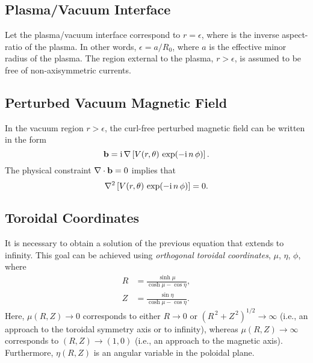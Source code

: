 \documentclass[12pt,prb,aps]{revtex4-1}
\begin{document}
\subsection{Plasma/Vacuum Interface}
Let the plasma/vacuum interface  correspond to $r=\epsilon$, where  is the inverse aspect-ratio of the
plasma. In other words, $\epsilon=a/R_0$, where $a$ is the effective minor radius of the plasma. 
The region external to the plasma, $r>\epsilon$, is assumed to be  free of non-axisymmetric currents.

\subsection{Perturbed Vacuum Magnetic Field}\label{pertb}
In the vacuum region $r>\epsilon$, the curl-free perturbed magnetic field can be written in the form\,\cite{am1}
\begin{equation}\label{vdef}
{\bf b} = {\rm i}\,\nabla\left[ V(r,\theta)\,\exp(-{\rm i}\,n\,\phi)\right].
\end{equation}
The physical constraint $\nabla\cdot {\bf b} =0$ implies that
\begin{equation}\label{elaplace}
\nabla^2 \left[V(r,\theta)\,\exp(-{\rm i}\,n\,\phi)\right]= 0.
\end{equation}

\subsection{Toroidal Coordinates}
It is necessary to obtain a solution of the previous equation that extends to infinity. This goal can be achieved using {\em orthogonal toroidal coordinates}, $\mu$, $\eta$, $\phi$, 
where\,\cite{morse}
\begin{align}\label{e54cx}
R &= \frac{\sinh\mu}{\cosh\mu-\cos\eta},\\[0.5ex]
Z&= \frac{\sin\eta}{\cosh\mu-\cos\eta}.\label{e55cc}
\end{align}
Here, $\mu(R,Z)\rightarrow 0$ corresponds to either $R\rightarrow 0$ or $(R^{\,2}+Z^{\,2})^{1/2}\rightarrow\infty$ (i.e.,
an approach to the toroidal symmetry axis or to infinity), whereas $\mu(R,Z)\rightarrow \infty$
corresponds to $(R, Z) \rightarrow (1, 0)$ (i.e., an approach to the magnetic axis). Furthermore, $\eta(R,Z)$ is an angular variable in the poloidal
plane. 
\end{document}
